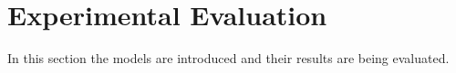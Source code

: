 \section{Experimental Evaluation}
In this section the models are introduced and their results are being evaluated.





